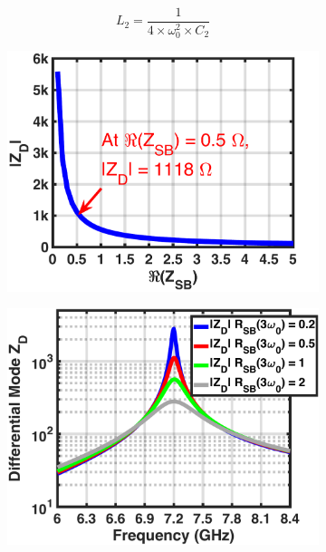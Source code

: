 \documentclass[conference]{IEEEtran}
\begin{document}
\vspace{-0.05in}
\begin{equation}
    L_2=\frac{1}{4\times\omega_0^2\times C_2}%
    \label{eqn:Design_A_2H}
\end{equation}

\begin{figure}[!t]
\captionsetup{font=footnotesize}
\centering
\begin{subfigure}{0.24\textwidth}
\includegraphics[width=1\textwidth]{Images/Design/Design_A_Zn_3H.pdf}
\caption{}
\label{fig:Design_A_Zn_3H}
\end{subfigure}
\begin{subfigure}{0.24\textwidth}
\includegraphics[width=1\textwidth]{Images/Design/Design_A_Rn_var_3H.pdf}

\end{subfigure}
\end{figure}
\end{document}
